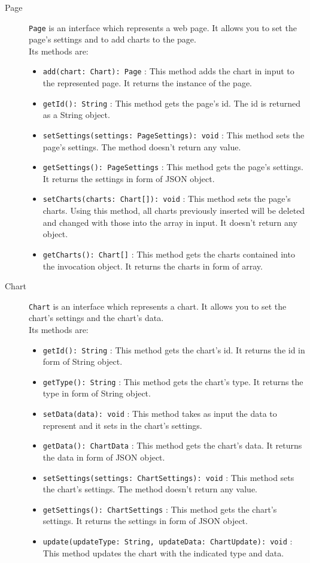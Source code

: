 \begin{description}
\begin{itemize}
		\end{itemize}
	\item[Page] \texttt{Page} is an interface which represents a web page. It allows you to set the page's settings and to add charts to the page.\\
	Its methods are:
	\begin{itemize}
		\item \texttt{add(chart: Chart): Page} : This method adds the chart in input to the represented page. It returns the instance of the page.
		\item \texttt{getId(): String} : This method gets the page's id. The id is returned as a String object.
		\item \texttt{setSettings(settings: PageSettings): void} : This method sets the page's settings. The method doesn't return any value.
		\item \texttt{getSettings(): PageSettings} : This method gets the page's settings. It returns the settings in form of JSON object.
		\item \texttt{setCharts(charts: Chart[]): void} : This method sets the page's charts. Using this method, all charts previously inserted will be deleted and changed with those into the array in input. It doesn't return any object.
		\item \texttt{getCharts(): Chart[]} : This method gets the charts contained into the invocation object. It returns the charts in form of array.
	\end{itemize}
	
	\item[Chart] \texttt{Chart} is an interface which represents a chart. It allows you to set the chart's settings and the chart's data.\\
	Its methods are:
	\begin{itemize}
		\item \texttt{getId(): String} : This method gets the chart's id. It returns the id in form of String object.
		\item \texttt{getType(): String} : This method gets the chart's type. It returns the type in form of String object.
		\item \texttt{setData(data): void} : This method takes as input the data to represent and it sets in the chart's settings.
		\item \texttt{getData(): ChartData} : This method gets the chart's data. It returns the data in form of JSON object.
		\item \texttt{setSettings(settings: ChartSettings): void} : This method sets the chart's settings. The method doesn't return any value.
		\item \texttt{getSettings(): ChartSettings} : This method gets the chart's settings. It returns the settings in form of JSON object.
		\item \texttt{update(updateType: String, updateData: ChartUpdate): void} : This method updates the chart with the indicated type and data. 
	\end{itemize}
	\end{description}
